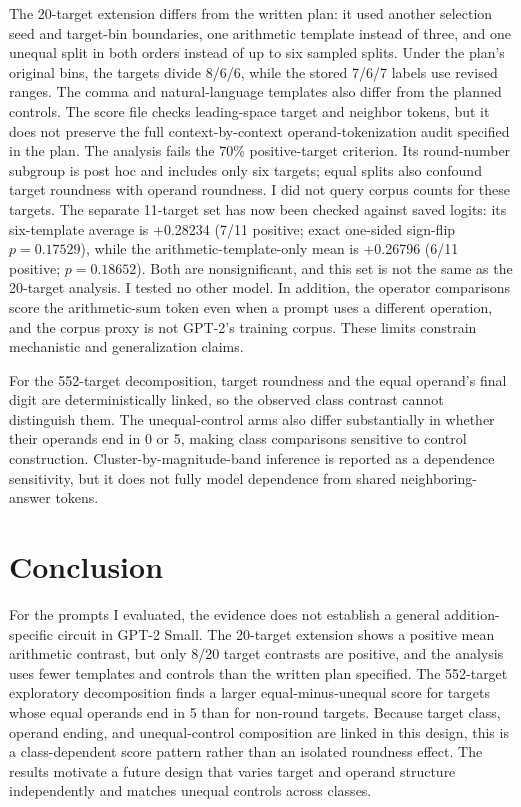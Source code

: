 \documentclass[11pt]{article}
\begin{document}
The 20-target extension differs from the written plan: it used another selection seed and target-bin boundaries, one arithmetic template instead of three, and one unequal split in both orders instead of up to six sampled splits. Under the plan's original bins, the targets divide 8/6/6, while the stored 7/6/7 labels use revised ranges. The comma and natural-language templates also differ from the planned controls. The score file checks leading-space target and neighbor tokens, but it does not preserve the full context-by-context operand-tokenization audit specified in the plan. The analysis fails the 70\% positive-target criterion. Its round-number subgroup is post hoc and includes only six targets; equal splits also confound target roundness with operand roundness. I did not query corpus counts for these targets. The separate 11-target set has now been checked against saved logits: its six-template average is +0.28234 (7/11 positive; exact one-sided sign-flip $p=0.17529$), while the arithmetic-template-only mean is +0.26796 (6/11 positive; $p=0.18652$). Both are nonsignificant, and this set is not the same as the 20-target analysis. I tested no other model. In addition, the operator comparisons score the arithmetic-sum token even when a prompt uses a different operation, and the corpus proxy is not GPT-2's training corpus. These limits constrain mechanistic and generalization claims.

For the 552-target decomposition, target roundness and the equal operand's final digit are deterministically linked, so the observed class contrast cannot distinguish them. The unequal-control arms also differ substantially in whether their operands end in 0 or 5, making class comparisons sensitive to control construction. Cluster-by-magnitude-band inference is reported as a dependence sensitivity, but it does not fully model dependence from shared neighboring-answer tokens.

\section{Conclusion}

For the prompts I evaluated, the evidence does not establish a general addition-specific circuit in GPT-2 Small. The 20-target extension shows a positive mean arithmetic contrast, but only 8/20 target contrasts are positive, and the analysis uses fewer templates and controls than the written plan specified. The 552-target exploratory decomposition finds a larger equal-minus-unequal score for targets whose equal operands end in 5 than for non-round targets. Because target class, operand ending, and unequal-control composition are linked in this design, this is a class-dependent score pattern rather than an isolated roundness effect. The results motivate a future design that varies target and operand structure independently and matches unequal controls across classes.
\end{document}
